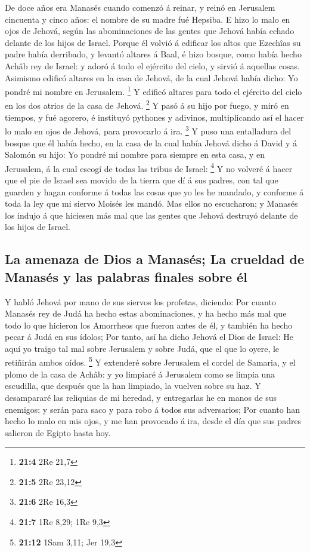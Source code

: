  De doce años era Manasés cuando comenzó á reinar, y reinó
en Jerusalem cincuenta y cinco años: el nombre de su madre fué Hepsiba.
 E hizo lo malo en ojos de Jehová, según las abominaciones
de las gentes que Jehová había echado delante de los hijos de Israel.
 Porque él volvió á edificar los altos que Ezechîas su
padre había derribado, y levantó altares á Baal, é hizo bosque, como
había hecho Achâb rey de Israel: y adoró á todo el ejército del cielo, y
sirvió á aquellas cosas.  Asimismo edificó altares en la
casa de Jehová, de la cual Jehová había dicho: Yo pondré mi nombre en
Jerusalem. \footnote{\textbf{21:4} 2Re 21,7}  Y edificó
altares para todo el ejército del cielo en los dos atrios de la casa de
Jehová. \footnote{\textbf{21:5} 2Re 23,12}  Y pasó á su
hijo por fuego, y miró en tiempos, y fué agorero, é instituyó pythones y
adivinos, multiplicando así el hacer lo malo en ojos de Jehová, para
provocarlo á ira. \footnote{\textbf{21:6} 2Re 16,3}  Y
puso una entalladura del bosque que él había hecho, en la casa de la
cual había Jehová dicho á David y á Salomón su hijo: Yo pondré mi nombre
para siempre en esta casa, y en Jerusalem, á la cual escogí de todas las
tribus de Israel: \footnote{\textbf{21:7} 1Re 8,29; 1Re 9,3}
 Y no volveré á hacer que el pie de Israel sea movido de
la tierra que dí á sus padres, con tal que guarden y hagan conforme á
todas las cosas que yo les he mandado, y conforme á toda la ley que mi
siervo Moisés les mandó.  Mas ellos no escucharon; y
Manasés los indujo á que hiciesen más mal que las gentes que Jehová
destruyó delante de los hijos de Israel.

\hypertarget{la-amenaza-de-dios-a-manasuxe9s-la-crueldad-de-manasuxe9s-y-las-palabras-finales-sobre-uxe9l}{%
\subsection{La amenaza de Dios a Manasés; La crueldad de Manasés y las
palabras finales sobre
él}\label{la-amenaza-de-dios-a-manasuxe9s-la-crueldad-de-manasuxe9s-y-las-palabras-finales-sobre-uxe9l}}

 Y habló Jehová por mano de sus siervos los profetas,
diciendo:  Por cuanto Manasés rey de Judá ha hecho estas
abominaciones, y ha hecho más mal que todo lo que hicieron los Amorrheos
que fueron antes de él, y también ha hecho pecar á Judá en sus ídolos;
 Por tanto, así ha dicho Jehová el Dios de Israel: He
aquí yo traigo tal mal sobre Jerusalem y sobre Judá, que el que lo
oyere, le retiñirán ambos oídos. \footnote{\textbf{21:12} 1Sam 3,11; Jer
  19,3}  Y extenderé sobre Jerusalem el cordel de
Samaria, y el plomo de la casa de Achâb: y yo limpiaré á Jerusalem como
se limpia una escudilla, que después que la han limpiado, la vuelven
sobre su haz.  Y desampararé las reliquias de mi heredad,
y entregarlas he en manos de sus enemigos; y serán para saco y para robo
á todos sus adversarios;  Por cuanto han hecho lo malo en
mis ojos, y me han provocado á ira, desde el día que sus padres salieron
de Egipto hasta hoy.

